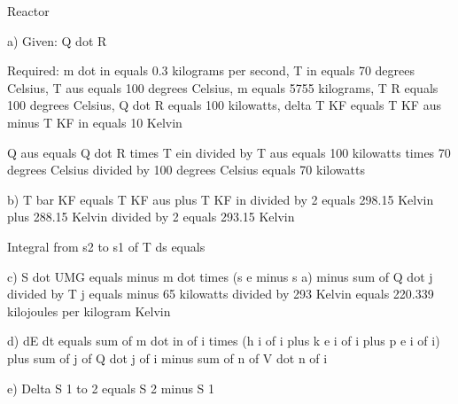 Reactor

a) Given: Q dot R

Required: m dot in equals 0.3 kilograms per second, T in equals 70 degrees Celsius, T aus equals 100 degrees Celsius, m equals 5755 kilograms, T R equals 100 degrees Celsius, Q dot R equals 100 kilowatts, delta T KF equals T KF aus minus T KF in equals 10 Kelvin

Q aus equals Q dot R times T ein divided by T aus equals 100 kilowatts times 70 degrees Celsius divided by 100 degrees Celsius equals 70 kilowatts

b) T bar KF equals T KF aus plus T KF in divided by 2 equals 298.15 Kelvin plus 288.15 Kelvin divided by 2 equals 293.15 Kelvin

Integral from s2 to s1 of T ds equals

c) S dot UMG equals minus m dot times (s e minus s a) minus sum of Q dot j divided by T j equals minus 65 kilowatts divided by 293 Kelvin equals 220.339 kilojoules per kilogram Kelvin

d) dE dt equals sum of m dot in of i times (h i of i plus k e i of i plus p e i of i) plus sum of j of Q dot j of i minus sum of n of V dot n of i

e) Delta S 1 to 2 equals S 2 minus S 1